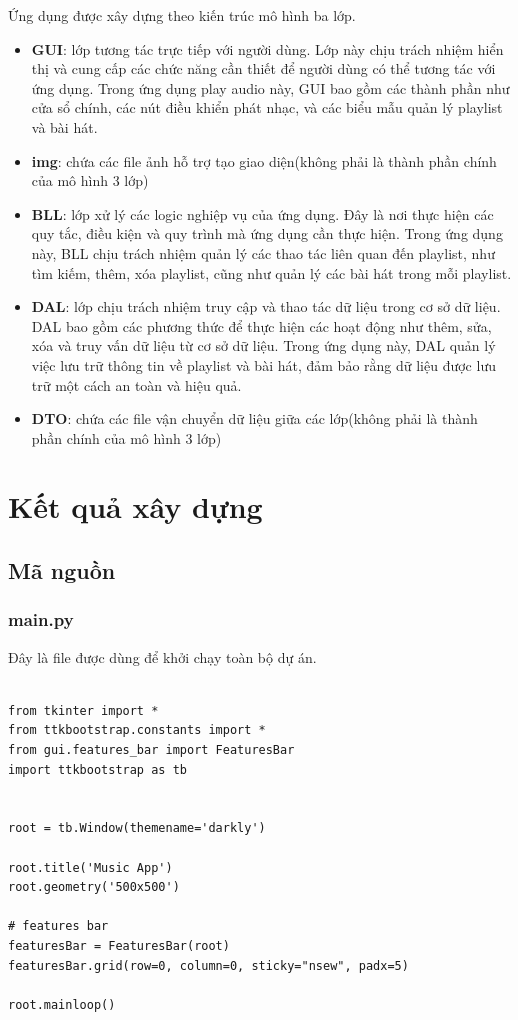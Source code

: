\documentclass[a4paper]{article}
\begin{document}
Ứng dụng được xây dựng theo kiến trúc mô hình ba lớp.
\begin{itemize}
    \item \textbf{GUI}: lớp tương tác trực tiếp với người dùng. Lớp này chịu trách nhiệm hiển thị và cung cấp các chức năng cần thiết để người dùng có thể tương tác với ứng dụng. Trong ứng dụng play audio này, GUI bao gồm các thành phần như cửa sổ chính, các nút điều khiển phát nhạc, và các biểu mẫu quản lý playlist và bài hát.
    \item \textbf{img}: chứa các file ảnh hỗ trợ tạo giao diện(không phải là thành phần chính của mô hình 3 lớp)
    \item \textbf{BLL}: lớp xử lý các logic nghiệp vụ của ứng dụng. Đây là nơi thực hiện các quy tắc, điều kiện và quy trình mà ứng dụng cần thực hiện. Trong ứng dụng này, BLL chịu trách nhiệm quản lý các thao tác liên quan đến playlist, như tìm kiếm, thêm, xóa playlist, cũng như quản lý các bài hát trong mỗi playlist.
    \item \textbf{DAL}: lớp chịu trách nhiệm truy cập và thao tác dữ liệu trong cơ sở dữ liệu. DAL bao gồm các phương thức để thực hiện các hoạt động như thêm, sửa, xóa và truy vấn dữ liệu từ cơ sở dữ liệu. Trong ứng dụng này, DAL quản lý việc lưu trữ thông tin về playlist và bài hát, đảm bảo rằng dữ liệu được lưu trữ một cách an toàn và hiệu quả.
    \item \textbf{DTO}: chứa các file vận chuyển dữ liệu giữa các lớp(không phải là thành phần chính của mô hình 3 lớp)
\end{itemize}


\section{Kết quả xây dựng}
\subsection{Mã nguồn}
\subsubsection{main.py}
Đây là file được dùng để khởi chạy toàn bộ dự án. 
\begin{mdframed}[hidealllines=true,backgroundcolor=magenta!10]
\begin{lstlisting}

from tkinter import *
from ttkbootstrap.constants import *
from gui.features_bar import FeaturesBar
import ttkbootstrap as tb


root = tb.Window(themename='darkly')

root.title('Music App')
root.geometry('500x500')

# features bar
featuresBar = FeaturesBar(root)
featuresBar.grid(row=0, column=0, sticky="nsew", padx=5)

root.mainloop()

\end{lstlisting}
\end{mdframed}
\end{document}

